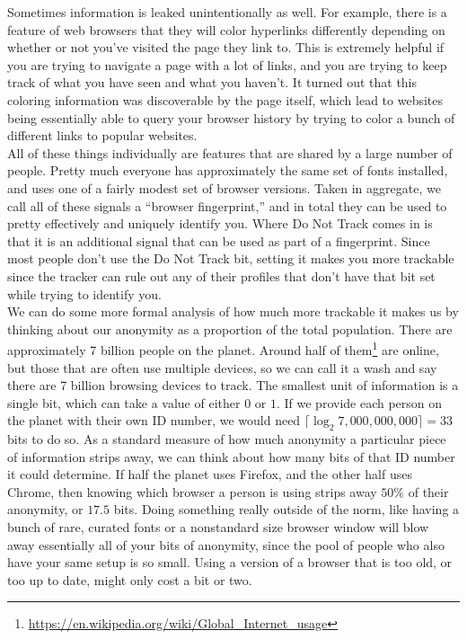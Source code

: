\documentclass{article}
\begin{document}
Sometimes information is leaked unintentionally as well. For example, there is a feature of web browsers that they will color hyperlinks differently depending on whether or not you've visited the page they link to. This is extremely helpful if you are trying to navigate a page with a lot of links, and you are trying to keep track of what you have seen and what you haven't. It turned out that this coloring information was discoverable by the page itself, which lead to websites being essentially able to query your browser history by trying to color a bunch of different links to popular websites.\\

All of these things individually are features that are shared by a large number of people. Pretty much everyone has approximately the same set of fonts installed, and uses one of a fairly modest set of browser versions. Taken in aggregate, we call all of these signals a ``browser fingerprint,'' and in total they can be used to pretty effectively and uniquely identify you. Where Do Not Track comes in is that it is an additional signal that can be used as part of a fingerprint. Since most people don't use the Do Not Track bit, setting it makes you more trackable since the tracker can rule out any of their profiles that don't have that bit set while trying to identify you.\\

We can do some more formal analysis of how much more trackable it makes us by thinking about our anonymity as a proportion of the total population. There are approximately 7 billion people on the planet. Around half of them\footnote{\url{https://en.wikipedia.org/wiki/Global_Internet_usage}} are online, but those that are often use multiple devices, so we can call it a wash and say there are 7 billion browsing devices to track. The smallest unit of information is a single bit, which can take a value of either $0$ or $1$. If we provide each person on the planet with their own ID number, we would need $\lceil\log_2{7,000,000,000}\rceil = 33$ bits to do so. As a standard measure of how much anonymity a particular piece of information strips away, we can think about how many bits of that ID number it could determine. If half the planet uses Firefox, and the other half uses Chrome, then knowing which browser a person is using strips away $50\%$ of their anonymity, or $17.5$ bits. Doing something really outside of the norm, like having a bunch of rare, curated fonts or a nonstandard size browser window will blow away essentially all of your bits of anonymity, since the pool of people who also have your same setup is so small. Using a version of a browser that is too old, or too up to date, might only cost a bit or two.\\
\end{document}
